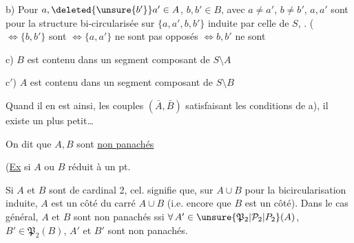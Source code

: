 b) Pour $a,\deleted{\unsure{b'}}a'\in A$, $b,b'\in B$, avec $a\ne a'$, $b\ne b'$,  $a,a'$ sont   pour la structure bi-circularisée sur  $\{a,a',b,b'\}$ induite par celle de $S$, . ($\Longleftrightarrow\{b,b'\}$ sont   $\Longleftrightarrow\{a,a'\}$ ne sont pas opposés $\Longleftrightarrow b,b'$ ne sont 

c) $B$ est contenu dans un segment composant de $S\setminus A$

c$'$) $A$ est contenu dans un segment composant de $S\setminus B$


Quand il en est ainsi,  les couples $(\bar A,\bar B)$  satisfaisant les conditions de a), il existe un plus petit\ldots

On dit que $A,B$ sont \uline{non panachés}

(\uline{Ex} si  $A$ ou $B$ réduit à un pt. 

Si $A$ et $B$ sont de cardinal 2, cel. signifie que, sur $A\cup B$ pour la bicircularisation induite, $A$ est un côté du carré $A\cup B$ (i.e. encore que $B$ est un côté). Dans le cas général, $A$ et $B$ sont non panachés ssi $\forall\, A'\in\unsure{\mathfrak P_2|\mathcal P_2|P_2}(A)$, $B'\in\mathfrak P_2(B)$, $A'$ et $B'$ sont non panachés.


